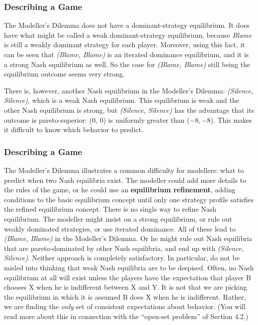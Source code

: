  \begin{frame}[fragile]\frametitle{Describing a Game}

The  {    Modeller's Dilemma}   does not have a dominant-strategy equilibrium.
It does have what might be called a weak dominant-strategy equilibrium, because
{\it Blame} is still a weakly dominant strategy for each player. Moreover, using
this fact, it can be seen that {\it (Blame, Blame)} is an iterated dominance
equilibrium, and it is a strong Nash equilibrium as well. So the case for {\it
(Blame, Blame)} still being the equilibrium outcome seems very strong.

 There is, however, another Nash equilibrium in  {the   Modeller's Dilemma}:
{\it (Silence, Silence)}, which is   a weak Nash equilibrium. This equilibrium
is weak and the other Nash equilibrium is strong, but {\it (Silence, Silence)}
has the advantage that its outcome is pareto-superior: (0, 0) is uniformly
greater than ($-8,-8$). This makes it difficult to know which behavior to
predict.

\end{frame}
 \begin{frame}[fragile]\frametitle{Describing a Game}
   { The  Modeller's Dilemma}   illustrates a common  difficulty for modellers:
what to predict when two Nash equilibria exist. The modeller could add more
details to the rules of the game, or he could use an {\bf equilibrium
refinement}, adding  conditions to the basic equilibrium concept until only one
strategy profile satisfies the refined equilibrium concept. There is no single
way to refine Nash equilibrium. The modeller might insist on a strong
equilibrium, or rule out   weakly dominated strategies, or use iterated
dominance. All of these lead to {\it (Blame, Blame)} in {the  Modeller's
Dilemma}.  Or he might rule out Nash equilibria that are pareto-dominated by
other Nash equilibria, and end  up with {\it (Silence, Silence)}. Neither
approach is completely satisfactory. In particular, do not be misled into
thinking that weak Nash equilibria are to be despised. Often, no  Nash
equilibrium  at all will exist unless the players have the expectation that
player B chooses X when he is indifferent between X and Y. It is not that we are
picking the  equilibrium in which it is assumed  B does X when he is
indifferent. Rather, we are finding the {\it only} set of consistent
expectations about behavior. (You will read more about this in connection with
the ``open-set problem'' of Section 4.2.)

\end{frame}
